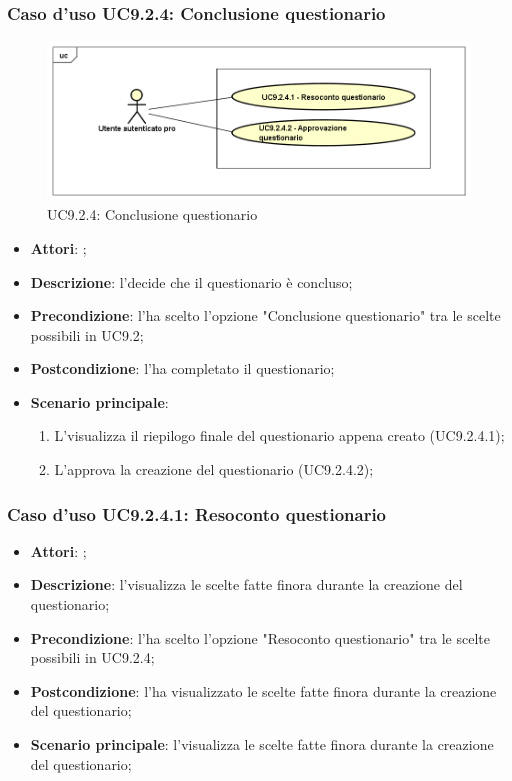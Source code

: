 		\subsubsection{Caso d'uso UC9.2.4: Conclusione questionario}
		\label{UC9.2.4}
		\begin{figure}[h]
			\centering
			\includegraphics[scale=0.5,keepaspectratio]{UML/UC9_2_4.png}
			\caption{UC9.2.4: Conclusione questionario}
		\end{figure}
		\FloatBarrier
		\begin{itemize}
			\item \textbf{Attori}: \uaupro; 
			\item \textbf{Descrizione}: l'\uaupro decide che il questionario è concluso;
			\item \textbf{Precondizione}: l'\uaupro ha scelto l'opzione "Conclusione questionario" tra le scelte possibili in UC9.2;
			\item \textbf{Postcondizione}: l'\uaupro ha completato il questionario;
			\item \textbf{Scenario principale}: 
				\begin{enumerate}
					\item L'\uaupro visualizza il riepilogo finale del questionario appena creato (UC9.2.4.1); 
					\item L'\uaupro approva la creazione del questionario (UC9.2.4.2); 
				\end{enumerate}
		\end{itemize}
				
			\subsubsection{Caso d'uso UC9.2.4.1: Resoconto questionario}
			\label{UC9.2.4.1}
			\begin{itemize}
				\item \textbf{Attori}: \uaupro;
				\item \textbf{Descrizione}: l'\uaupro visualizza le scelte fatte finora durante la creazione del questionario;
				\item \textbf{Precondizione}: l'\uaupro ha scelto l'opzione "Resoconto questionario" tra le scelte possibili in UC9.2.4;
				\item \textbf{Postcondizione}: l'\uaupro ha visualizzato le scelte fatte finora durante la creazione del questionario;
				\item \textbf{Scenario principale}: l'\uaupro visualizza le scelte fatte finora durante la creazione del questionario;
			\end{itemize}
			
